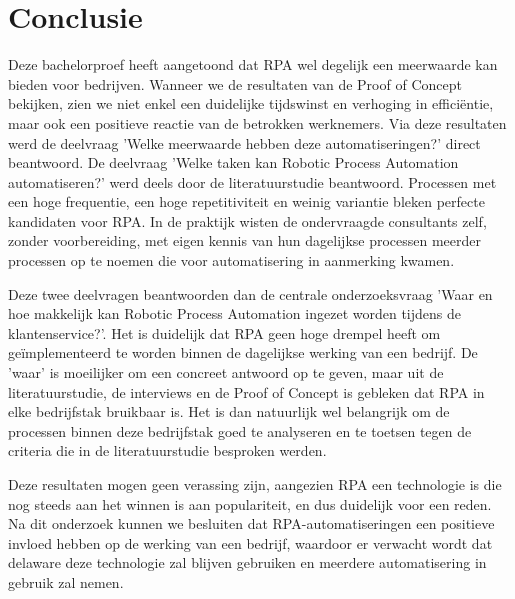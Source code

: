 
\chapter{Conclusie}%
\label{ch:conclusie}


Deze bachelorproef heeft aangetoond dat RPA wel degelijk een meerwaarde kan bieden voor bedrijven.
Wanneer we de resultaten van de Proof of Concept bekijken, zien we niet enkel een duidelijke tijdswinst en verhoging in efficiëntie, maar ook een positieve reactie van de betrokken werknemers.
Via deze resultaten werd de deelvraag 'Welke meerwaarde hebben deze automatiseringen?' direct beantwoord.
De deelvraag 'Welke taken kan Robotic Process Automation automatiseren?' werd deels door de literatuurstudie beantwoord. Processen met een hoge frequentie, een hoge repetitiviteit en weinig variantie bleken perfecte kandidaten voor RPA.
In de praktijk wisten de ondervraagde consultants zelf, zonder voorbereiding, met eigen kennis van hun dagelijkse processen meerder processen op te noemen die voor automatisering in aanmerking kwamen.

Deze twee deelvragen beantwoorden dan de centrale onderzoeksvraag 'Waar en hoe makkelijk kan Robotic Process Automation ingezet worden tijdens de klantenservice?'. Het is duidelijk dat RPA geen hoge drempel heeft om geïmplementeerd te worden binnen de dagelijkse werking van een bedrijf.
De 'waar' is moeilijker om een concreet antwoord op te geven, maar uit de literatuurstudie, de interviews en de Proof of Concept is gebleken dat RPA in elke bedrijfstak bruikbaar is. Het is dan natuurlijk wel belangrijk om de processen binnen deze bedrijfstak goed te analyseren en te toetsen tegen de criteria die in de literatuurstudie besproken werden.

Deze resultaten mogen geen verassing zijn, aangezien RPA een technologie is die nog steeds aan het winnen is aan populariteit, en dus duidelijk voor een reden.
Na dit onderzoek kunnen we besluiten dat RPA-automatiseringen een positieve invloed hebben op de werking van een bedrijf, waardoor er verwacht wordt dat delaware deze technologie zal blijven gebruiken en meerdere automatisering in gebruik zal nemen.
